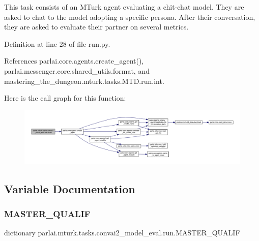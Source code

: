 \begin{DoxyVerb}This task consists of an MTurk agent evaluating a chit-chat model. They
are asked to chat to the model adopting a specific persona. After their
conversation, they are asked to evaluate their partner on several metrics.
\end{DoxyVerb}
 

Definition at line 28 of file run.\+py.



References parlai.\+core.\+agents.\+create\+\_\+agent(), parlai.\+messenger.\+core.\+shared\+\_\+utils.\+format, and mastering\+\_\+the\+\_\+dungeon.\+mturk.\+tasks.\+M\+T\+D.\+run.\+int.

Here is the call graph for this function\+:
\nopagebreak
\begin{figure}[H]
\begin{center}
\leavevmode
\includegraphics[width=350pt]{namespaceparlai_1_1mturk_1_1tasks_1_1convai2__model__eval_1_1run_a1624989606bd5fc34368102c32217178_cgraph}
\end{center}
\end{figure}


\subsection{Variable Documentation}
\mbox{\label{namespaceparlai_1_1mturk_1_1tasks_1_1convai2__model__eval_1_1run_ad109e0d8716c462fd34311249d56f8a4}} 
\subsubsection{\texorpdfstring{M\+A\+S\+T\+E\+R\+\_\+\+Q\+U\+A\+L\+IF}{MASTER\_QUALIF}}
{\footnotesize\ttfamily dictionary parlai.\+mturk.\+tasks.\+convai2\+\_\+model\+\_\+eval.\+run.\+M\+A\+S\+T\+E\+R\+\_\+\+Q\+U\+A\+L\+IF}

